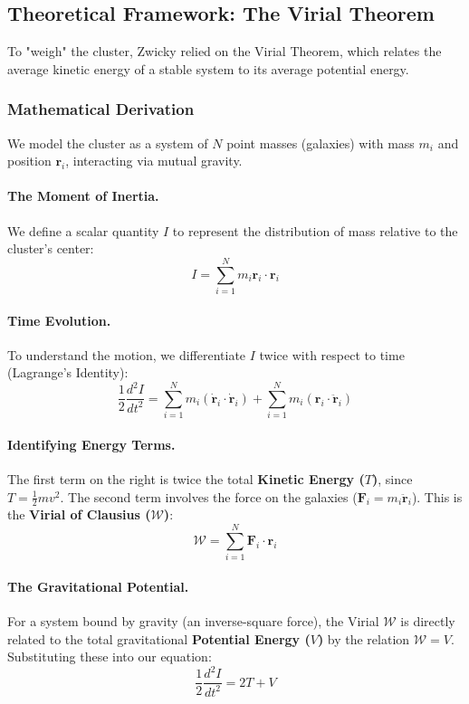\documentclass[11pt, a4paper]{article}
\begin{document}
\subsection{Theoretical Framework: The Virial Theorem}
To "weigh" the cluster, Zwicky relied on the Virial Theorem, which relates the average kinetic energy of a stable system to its average potential energy.

\subsubsection{Mathematical Derivation}
We model the cluster as a system of $N$ point masses (galaxies) with mass $m_i$ and position $\mathbf{r}_i$, interacting via mutual gravity.

\paragraph{The Moment of Inertia.} 
We define a scalar quantity $I$ to represent the distribution of mass relative to the cluster's center:
\begin{equation}
    I = \sum_{i=1}^{N} m_i \mathbf{r}_i \cdot \mathbf{r}_i
\end{equation}

\paragraph{Time Evolution.}
To understand the motion, we differentiate $I$ twice with respect to time (Lagrange's Identity):
\begin{equation}
    \frac{1}{2} \frac{d^2I}{dt^2} = \sum_{i=1}^{N} m_i (\dot{\mathbf{r}}_i \cdot \dot{\mathbf{r}}_i) + \sum_{i=1}^{N} m_i (\mathbf{r}_i \cdot \ddot{\mathbf{r}}_i)
\end{equation}

\paragraph{Identifying Energy Terms.}
The first term on the right is twice the total \textbf{Kinetic Energy ($T$)}, since $T = \frac{1}{2}mv^2$. The second term involves the force on the galaxies ($\mathbf{F}_i = m_i \ddot{\mathbf{r}}_i$). This is the \textbf{Virial of Clausius ($\mathcal{W}$)}:
\begin{equation}
    \mathcal{W} = \sum_{i=1}^{N} \mathbf{F}_i \cdot \mathbf{r}_i
\end{equation}

\paragraph{The Gravitational Potential.}
For a system bound by gravity (an inverse-square force), the Virial $\mathcal{W}$ is directly related to the total gravitational \textbf{Potential Energy ($V$)} by the relation $\mathcal{W} = V$. Substituting these into our equation:
\begin{equation}
    \frac{1}{2} \frac{d^2I}{dt^2} = 2T + V
\end{equation}
\end{document}

